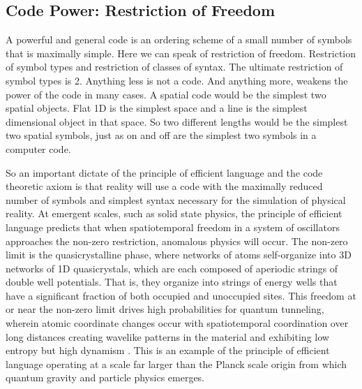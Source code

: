 \documentclass[submission,copyright,creativecommons]{eptcs}
\begin{document}
\subsection{Code Power: Restriction of Freedom}

A powerful and general code is an ordering scheme of a small number of symbols that is maximally simple. Here we can speak of restriction of freedom. Restriction of symbol types and restriction of classes of syntax. The ultimate restriction of symbol types is 2. Anything less is not a code. And anything more, weakens the power of the code in many cases. A spatial code would be the simplest two spatial objects. Flat 1D is the simplest space and a line is the simplest dimensional object in that space. So two different lengths would be the simplest two spatial symbols, just as on and off are the simplest two symbols in a computer code.

So an important dictate of the principle of efficient language and the code theoretic axiom is that reality will use a code with the maximally reduced number of symbols and simplest syntax necessary for the simulation of physical reality. At emergent scales, such as solid state physics, the principle of efficient language predicts that when spatiotemporal freedom in a system of oscillators approaches the non-zero restriction, anomalous physics will occur. The non-zero limit is the quasicrystalline phase, where networks of atoms self-organize into 3D networks of 1D quasicrystals, which are each composed of aperiodic strings of double well potentials. That is, they organize into strings of energy wells that have a significant fraction of both occupied and unoccupied sites. This freedom at or near the non-zero limit drives high probabilities for quantum tunneling, wherein atomic coordinate changes occur with spatiotemporal coordination over long distances creating wavelike patterns in the material and exhibiting low entropy but high dynamism \cite{irwin2017cold}. This is an example of the principle of efficient language operating at a scale far larger than the Planck scale origin from which quantum gravity and particle physics emerges.




\nocite{*}


\end{document}
